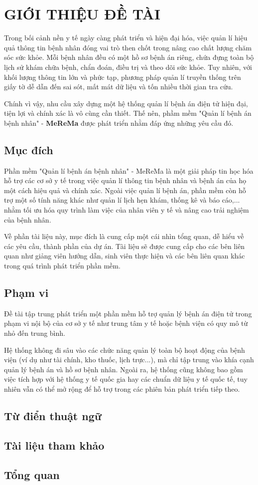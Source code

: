 \chapter{GIỚI THIỆU ĐỀ TÀI}

Trong bối cảnh nền y tế ngày càng phát triển và hiện đại hóa, việc quản lí hiệu quả thông tin bệnh nhân đóng vai trò then chốt trong nâng cao chất lượng chăm sóc sức khỏe. Mỗi bệnh nhân đều có một hồ sơ bệnh án riêng, chứa đựng toàn bộ lịch sử khám chữa bệnh, chẩn đoán, điều trị và theo dõi sức khỏe. Tuy nhiên, với khối lượng thông tin lớn và phức tạp, phương pháp quản lí truyền thống trên giấy tờ dễ dẫn đến sai sót, mất mát dữ liệu và tốn nhiều thời gian tra cứu.

Chính vì vậy, nhu cầu xây dựng một hệ thống quản lí bệnh án điện tử hiện đại, tiện lợi và chính xác là vô cùng cần thiết. Thế nên, phầm mềm "Quản lí bệnh án bệnh nhân" - \textbf{MeReMa} được phát triển nhằm đáp ứng những yêu cầu đó.

\section{Mục đích}

Phần mềm "Quản lí bệnh án bệnh nhân" - MeReMa là một giải pháp tin học hóa hỗ trợ các cơ sở y tế trong việc quản lí thông tin bệnh nhân và bệnh án của họ một cách hiệu quả và chính xác. Ngoài việc quản lí bệnh án, phần mềm còn hỗ trợ một số tính năng khác như quản lí lịch hẹn khám, thống kê và báo cáo,... nhằm tối ưu hóa quy trình làm việc của nhân viên y tế và nâng cao trải nghiệm của bệnh nhân.

Về phần tài liệu này, mục đích là cung cấp một cái nhìn tổng quan, dễ hiểu về các yêu cầu, thành phần của dự án. Tài liệu sẽ được cung cấp cho các bên liên quan như giảng viên hướng dẫn, sinh viên thực hiện và các bên liên quan khác trong quá trình phát triển phần mềm. 

\section{Phạm vi}

Đề tài tập trung phát triển một phần mềm hỗ trợ quản lý bệnh án điện tử trong phạm vi nội bộ của cơ sở y tế như trung tâm y tế hoặc bệnh viện có quy mô từ nhỏ đến trung bình.

Hệ thống không đi sâu vào các chức năng quản lý toàn bộ hoạt động của bệnh viện (ví dụ như tài chính, kho thuốc, lịch trực...), mà chỉ tập trung vào khía cạnh quản lý bệnh án và hồ sơ bệnh nhân. Ngoài ra, hệ thống cũng không bao gồm việc tích hợp với hệ thống y tế quốc gia hay các chuẩn dữ liệu y tế quốc tế, tuy nhiên vẫn có thể mở rộng để hỗ trợ trong các phiên bản phát triển tiếp theo.

\section{Từ điển thuật ngữ}

\section{Tài liệu tham khảo}

\section{Tổng quan}